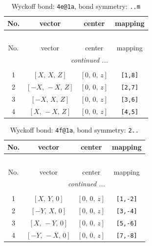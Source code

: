 \documentclass[fleqn,8pt]{jsarticle}
\begin{document}
\renewcommand{\arraystretch}{1.2}
\begin{longtable}{cccc}
\caption{Wyckoff bond: {\tt 4e@1a}, bond symmetry: {\tt ..m}}
 \\
 \hline \hline
No. & vector & center & mapping \\ \hline \endfirsthead

\multicolumn{3}{l}{\tablename\ \thetable{}} \\
 \hline \hline
No. & vector & center & mapping \\ \hline \endhead

 \hline \hline
\multicolumn{3}{r}{\footnotesize\it continued ...} \\ \endfoot

 \hline \hline
\multicolumn{3}{r}{} \\ \endlastfoot

1 & $\left[ X,\, X,\, Z \right]$ & $\left[ 0,\, 0,\, z \right]$ & {\tt [1,8]} \\ \hline
2 & $\left[ - X,\, - X,\, Z \right]$ & $\left[ 0,\, 0,\, z \right]$ & {\tt [2,7]} \\ \hline
3 & $\left[ - X,\, X,\, Z \right]$ & $\left[ 0,\, 0,\, z \right]$ & {\tt [3,6]} \\ \hline
4 & $\left[ X,\, - X,\, Z \right]$ & $\left[ 0,\, 0,\, z \right]$ & {\tt [4,5]} \\
\end{longtable}
\renewcommand{\arraystretch}{1.2}
\begin{longtable}{cccc}
\caption{Wyckoff bond: {\tt 4f@1a}, bond symmetry: {\tt 2..}}
 \\
 \hline \hline
No. & vector & center & mapping \\ \hline \endfirsthead

\multicolumn{3}{l}{\tablename\ \thetable{}} \\
 \hline \hline
No. & vector & center & mapping \\ \hline \endhead

 \hline \hline
\multicolumn{3}{r}{\footnotesize\it continued ...} \\ \endfoot

 \hline \hline
\multicolumn{3}{r}{} \\ \endlastfoot

1 & $\left[ X,\, Y,\, 0 \right]$ & $\left[ 0,\, 0,\, z \right]$ & {\tt [1,-2]} \\ \hline
2 & $\left[ - Y,\, X,\, 0 \right]$ & $\left[ 0,\, 0,\, z \right]$ & {\tt [3,-4]} \\ \hline
3 & $\left[ X,\, - Y,\, 0 \right]$ & $\left[ 0,\, 0,\, z \right]$ & {\tt [5,-6]} \\ \hline
4 & $\left[ - Y,\, - X,\, 0 \right]$ & $\left[ 0,\, 0,\, z \right]$ & {\tt [7,-8]} \\
\end{longtable}
\end{document}
